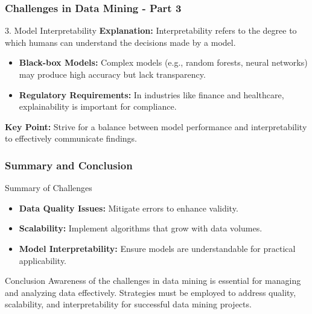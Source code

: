 \documentclass[aspectratio=169]{beamer}
\begin{document}
\begin{frame}[fragile]
    \frametitle{Challenges in Data Mining - Part 3}
    \begin{block}{3. Model Interpretability}
        \textbf{Explanation:} Interpretability refers to the degree to which humans can understand the decisions made by a model.

        \begin{itemize}
            \item \textbf{Black-box Models:} Complex models (e.g., random forests, neural networks) may produce high accuracy but lack transparency.
            \item \textbf{Regulatory Requirements:} In industries like finance and healthcare, explainability is important for compliance.
        \end{itemize}

        \textbf{Key Point:} Strive for a balance between model performance and interpretability to effectively communicate findings.
    \end{block}
\end{frame}

\begin{frame}[fragile]
    \frametitle{Summary and Conclusion}
    \begin{block}{Summary of Challenges}
        \begin{itemize}
            \item \textbf{Data Quality Issues:} Mitigate errors to enhance validity.
            \item \textbf{Scalability:} Implement algorithms that grow with data volumes.
            \item \textbf{Model Interpretability:} Ensure models are understandable for practical applicability.
        \end{itemize}
    \end{block}

    \begin{block}{Conclusion}
        Awareness of the challenges in data mining is essential for managing and analyzing data effectively. Strategies must be employed to address quality, scalability, and interpretability for successful data mining projects.
    \end{block}
\end{frame}
\end{document}
